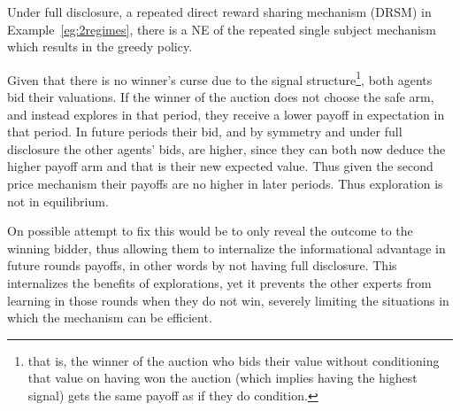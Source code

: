 Under full disclosure, a repeated direct reward sharing  mechanism (DRSM) in Example~\ref{eg:2regimes}, there is a NE of the repeated single subject mechanism which results in the greedy policy.

Given that there is no winner's curse due to the signal structure\footnote{that is, the winner of the auction who  bids their value without conditioning that value on having won the auction (which implies having the highest signal) gets the same payoff as if they do condition.}, both agents bid their valuations.
If the winner of the auction does not choose the safe arm, and instead explores in that period, they receive a lower payoff in expectation in that period. In future periods their bid, and by symmetry and under full disclosure the other agents' bids, are higher, since they can both now deduce the higher payoff arm and that is their new expected value. Thus given the second price mechanism their payoffs are no higher in later periods. Thus exploration is not in equilibrium. 


On possible attempt to fix this would be to only reveal the outcome to the winning bidder, thus allowing them to internalize the informational advantage in future rounds payoffs, in other words by not having full disclosure.
This internalizes the benefits of explorations, yet it prevents the other experts from learning in those rounds when they do not win, severely limiting the situations in which the mechanism can be efficient.




